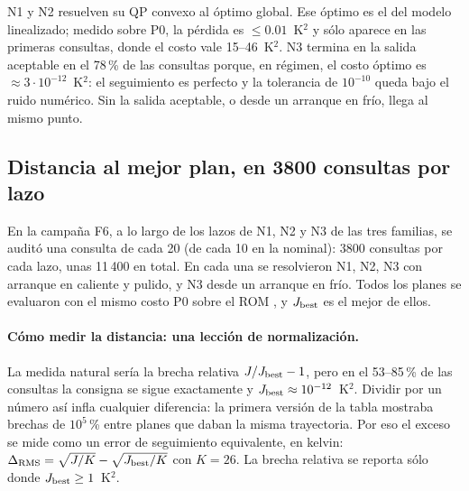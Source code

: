 \noindent N1 y N2 resuelven su QP convexo al óptimo global. Ese óptimo es el del modelo
linealizado; medido sobre P0, la pérdida es $\le0.01$~K$^2$ y sólo aparece en las primeras
consultas, donde el costo vale 15--46~K$^2$. N3 termina en la salida aceptable en el 78\,\% de
las consultas porque, en régimen, el costo óptimo es $\approx3\cdot10^{-12}$~K$^2$: el
seguimiento es perfecto y la tolerancia de $10^{-10}$ queda bajo el ruido numérico. Sin la
salida aceptable, o desde un arranque en frío, llega al mismo punto.

\subsection{Distancia al mejor plan, en 3800 consultas por lazo}
En la campaña F6, a lo largo de los lazos de N1, N2 y N3 de las tres familias, se auditó una
consulta de cada 20 (de cada 10 en la nominal): 3800 consultas por cada lazo, unas 11\,400 en
total. En cada una se
resolvieron N1, N2, N3 con arranque en caliente y pulido, y N3 desde un arranque en frío. Todos
los planes se evaluaron con el mismo costo P0 sobre el ROM , y $J_{\rm best}$ es el
mejor de ellos.

\paragraph{Cómo medir la distancia: una lección de normalización.} La medida natural sería la
brecha relativa $J/J_{\rm best}-1$, pero en el 53--85\,\% de las consultas la consigna se sigue
exactamente y $J_{\rm best}\approx10^{-12}$~K$^2$. Dividir por un número así infla cualquier
diferencia: la primera versión de la tabla mostraba brechas de $10^5$\,\% entre planes que
daban la misma trayectoria. Por eso el exceso se mide como un error de seguimiento equivalente,
en kelvin: $\Delta_{\rm RMS}=\sqrt{J/K}-\sqrt{J_{\rm best}/K}$ con $K=26$. La brecha relativa se
reporta sólo donde $J_{\rm best}\ge1$~K$^2$.

